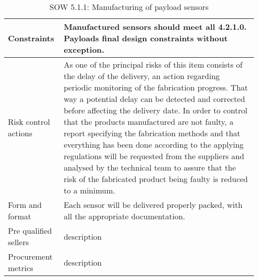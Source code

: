 \begin{table}[H]
\begin{tabular}{>{\raggedright\arraybackslash}p{3cm} >{\arraybackslash}p{11cm}}
		\midrule
		
		Constraints & Manufactured sensors should meet all 4.2.1.0. Payloads final design constraints without exception.\vspace{0.2cm} \\
		
		\midrule
		
		Risk control actions & As one of the principal risks of this item consists of the delay of the delivery, an action regarding periodic monitoring of the fabrication progress. That way a potential delay can be detected and corrected before affecting the delivery date.
		In order to control that the products manufactured are not faulty, a report specifying the fabrication methods and that everything has been done according to the applying regulations will be requested from the suppliers and analysed by the technical team to assure that the risk of the fabricated product being faulty is reduced to a minimum.\vspace{0.2cm} \\
		
		\midrule
		
		Form and format & Each sensor will be delivered properly packed, with all the appropriate documentation.\vspace{0.2cm} \\
		
		\midrule
		
		Pre qualified sellers & description\vspace{0.2cm} \\
		
		\midrule
		
		Procurement metrics & description\vspace{0.2cm} \\
		
		\bottomrule[2pt]		
		
	\end{tabular}
	\caption{SOW 5.1.1: Manufacturing of payload sensors}
\end{table}

